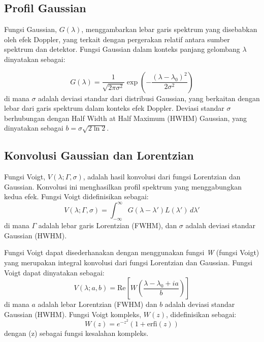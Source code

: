 \subsection{Profil Gaussian}
\par Fungsi Gaussian, \( G(\lambda) \), menggambarkan lebar garis spektrum yang disebabkan oleh efek Doppler, yang terkait dengan pergerakan relatif antara sumber spektrum dan detektor. Fungsi Gaussian dalam konteks panjang gelombang \( \lambda \) dinyatakan sebagai:

\begin{equation}
G(\lambda) = \frac{1}{\sqrt{2\pi \sigma^2}} \exp\left(-\frac{(\lambda - \lambda_0)^2}{2\sigma^2}\right)
\end{equation}
di mana \( \sigma \) adalah deviasi standar dari distribusi Gaussian, yang berkaitan dengan lebar dari garis spektrum dalam konteks efek Doppler. Deviasi standar \( \sigma \) berhubungan dengan Half Width at Half Maximum (HWHM) Gaussian, yang dinyatakan sebagai \( b = \sigma \sqrt{2 \ln 2} \).

\subsection{Konvolusi Gaussian dan Lorentzian}
\par Fungsi Voigt, \( V(\lambda; \Gamma, \sigma) \), adalah hasil konvolusi dari fungsi Lorentzian dan Gaussian. Konvolusi ini menghasilkan profil spektrum yang menggabungkan kedua efek. Fungsi Voigt didefinisikan sebagai:
\begin{equation}
V(\lambda; \Gamma, \sigma) = \int_{-\infty}^{\infty} G(\lambda - \lambda') L(\lambda') \, d\lambda'
\end{equation}
di mana \( \Gamma \) adalah lebar garis Lorentzian (FWHM), dan \( \sigma \) adalah deviasi standar Gaussian (HWHM).

\par Fungsi Voigt dapat disederhanakan dengan menggunakan fungsi \textit{W} (fungsi Voigt) yang merupakan integral konvolusi dari fungsi Lorentzian dan Gaussian. Fungsi Voigt dapat dinyatakan sebagai: %
\begin{equation}
V(\lambda; a, b) = \text{Re} \left[ W\left(\frac{\lambda - \lambda_0 + i a}{b}\right) \right]
\end{equation}
di mana \( a \) adalah lebar Lorentzian (FWHM) dan \( b \) adalah deviasi standar Gaussian (HWHM). Fungsi Voigt kompleks, \( W(z) \), didefinisikan sebagai:
\begin{equation}
W(z) = e^{-z^2} \left( 1 + \text{erfi}(z) \right)
\end{equation}
dengan (z) sebagai fungsi kesalahan kompleks.

